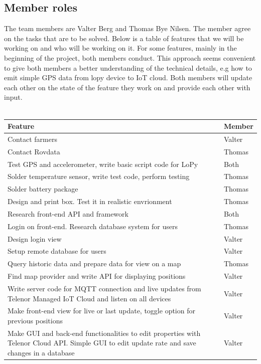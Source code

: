 	\subsection{Member roles}
		The team members are Valter Berg and Thomas Bye Nilsen. The member agree on the tasks that are to be solved. Below is a table of features that we will be working on and who will be working on it. For some features, mainly in the beginning of the project, both members conduct. This approach seems convenient to give both members a better understanding of the technical details, e.g how to emit simple GPS data from lopy device to IoT cloud. Both members will update each other on the state of the feature they work on and provide each other with input. 
		\\\\
		\begin{longtable}{ | p{10cm} | p{1.3cm}|}
			\hline
			\textbf{Feature} & \textbf{Member}\\ \hline
			Contact farmers & Valter\\ \hline
			Contact Rovdata & Thomas\\ \hline
			Test GPS and accelerometer, write basic script code for LoPy & Both\\ \hline
			Solder temperature sensor, write test code, perform testing & Thomas\\ \hline
			Solder battery package & Thomas\\ \hline
			Design and print box. Test it in realistic envrionment & Thomas\\ \hline
			Research front-end API and framework & Both\\ \hline
			Login on front-end. Research database system for users & Thomas\\ \hline
			Design login view & Valter\\ \hline
			Setup remote database for users & Valter\\ \hline
			Query historic data and prepare data for view on a map & Thomas\\ \hline
			Find map provider and write API for displaying positions & Valter\\ \hline
			Write server code for MQTT connection and live updates from Telenor Managed IoT Cloud and listen on all devices & Valter\\ \hline
			Make front-end view for live or last update, toggle option for previous positions& Valter\\ \hline
			Make GUI and back-end functionalities to edit properties with Telenor Cloud API. Simple GUI to edit update rate and save changes in a database & Valter\\ \hline

\end{longtable}

